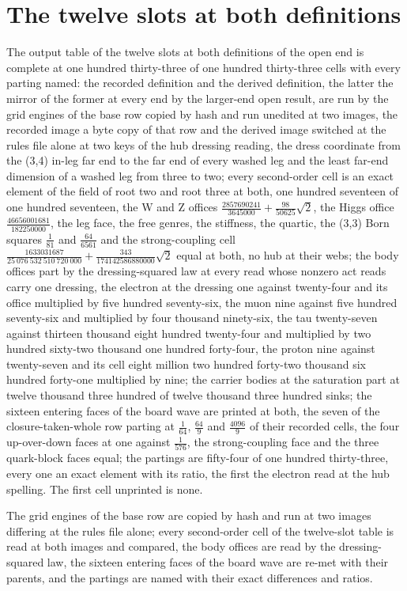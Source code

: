 \section{The twelve slots at both definitions}\label{mod:IV-8b-D540540-the-twelve-slots-at-both-definitions}
\begin{chtable}
The output table of the twelve slots at both definitions of the open end is complete at one hundred thirty-three of one hundred thirty-three cells with every parting named: the recorded definition and the derived definition, the latter the mirror of the former at every end by the larger-end open result, are run by the grid engines of the base row copied by hash and run unedited at two images, the recorded image a byte copy of that row and the derived image switched at the rules file alone at two keys of the hub dressing reading, the dress coordinate from the (3,4) in-leg far end to the far end of every washed leg and the least far-end dimension of a washed leg from three to two; every second-order cell is an exact element of the field of root two and root three at both, one hundred seventeen of one hundred seventeen, the W and Z offices $\tfrac{2857690241}{3645000} + \tfrac{98}{50625}\sqrt{2}$, the Higgs office $\tfrac{46656001681}{182250000}$, the leg face, the free genres, the stiffness, the quartic, the (3,3) Born squares $\tfrac{1}{81}$ and $\tfrac{64}{6561}$ and the strong-coupling cell $\tfrac{1633031687}{25\ 076\ 532\ 510\ 720\ 000} + \tfrac{343}{174142586880000}\sqrt{2}$ equal at both, no hub at their webs; the body offices part by the dressing-squared law at every read whose nonzero act reads carry one dressing, the electron at the dressing one against twenty-four and its office multiplied by five hundred seventy-six, the muon nine against five hundred seventy-six and multiplied by four thousand ninety-six, the tau twenty-seven against thirteen thousand eight hundred twenty-four and multiplied by two hundred sixty-two thousand one hundred forty-four, the proton nine against twenty-seven and its cell eight million two hundred forty-two thousand six hundred forty-one multiplied by nine; the carrier bodies at the saturation part at twelve thousand three hundred of twelve thousand three hundred sinks; the sixteen entering faces of the board wave are printed at both, the seven of the closure-taken-whole row parting at $\tfrac{1}{64}$, $\tfrac{64}{9}$ and $\tfrac{4096}{9}$ of their recorded cells, the four up-over-down faces at one against $\tfrac{1}{576}$, the strong-coupling face and the three quark-block faces equal; the partings are fifty-four of one hundred thirty-three, every one an exact element with its ratio, the first the electron read at the hub spelling. The first cell unprinted is none.
\end{chtable}
\chdeps{}{}
The grid engines of the base row are copied by hash and run at two images differing at the rules file alone; every second-order cell of the twelve-slot table is read at both images and compared, the body offices are read by the dressing-squared law, the sixteen entering faces of the board wave are re-met with their parents, and the partings are named with their exact differences and ratios.

